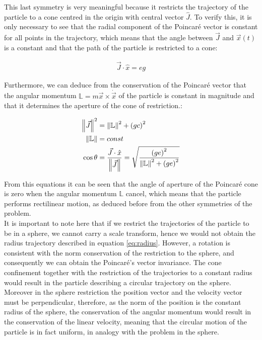 This last symmetry is very meaningful because it restricts the trajectory of the particle to a cone centred in the origin with central vector $\hat{J}$. To verify this, it is only necessary to see that the radial component of the Poincar\'e vector is constant for all points in the trajectory, which means that the angle between $\vec{J}$ and $\vec{x}(t)$ is a constant and that the path of the particle is restricted to a cone:

\begin{align*}
\vec{J}\cdot\hat{x} = eg
\end{align*}

Furthermore, we can deduce from the conservation of the Poincar\'e vector that the angular momentum $\mathbb{L}= m\vec{x}\times\dot{\vec{x}}$ of the particle is constant in magnitude and that it determines the aperture of the cone of restriction.:

\begin{equation}
\begin{aligned}
\left\lVert \vec{J} \right\rVert^2 &= \left\lVert \mathbb{L} \right\rVert^2 +\left( gc \right)^2\\
\left\lVert \mathbb{L} \right\rVert &= const\\
\cos{\theta} &= \frac{\vec{J}\cdot\hat{x}}{\left\lVert \vec{J} \right\rVert} = \sqrt{\frac{\left( ge \right)^2}{\left\lVert \mathbb{L} \right\rVert^2 +\left( ge \right)^2}}
\end{aligned}
\label{eq:poincarecone}
\end{equation}


From this equations it can be seen that the angle of aperture of the Poincar\'e cone is zero when the angular momentum $\mathbb{L}$ cancel, which means that the particle performs rectilinear motion, as deduced before from the other symmetries of the problem.\\

It is important to note here that if we restrict the trajectories of the particle to be in a sphere, we cannot carry a scale transform, hence we would not obtain the radius trajectory described in equation \eqref{eq:radius}. However, a rotation is consistent with the norm conservation of the restriction to the sphere, and consequently we can obtain the Poincar\'e's vector invariance. The cone confinement together with the restriction of the trajectories to a constant radius would result in the particle describing a circular trajectory on the sphere.\\ 

Moreover in the sphere restriction the position vector and the velocity vector must be perpendicular, therefore, as the norm of the position is the constant radius of the sphere, the conservation of the angular momentum would result in the conservation of the linear velocity, meaning that the circular motion of the particle is in fact uniform, in analogy with the problem in the sphere.\\

